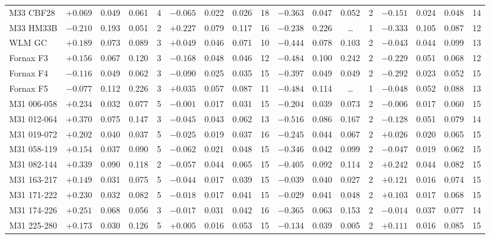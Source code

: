 \documentclass{aa}
\begin{document}
\begin{appendix}
\begin{table*}
\begin{adjustbox}{width=1\textwidth}
{\begin{tabular}{l cccccccccccccccc}
M33 CBF28     & $+0.069$ & 0.049 & 0.061 & 4 & $-0.065$ & 0.022 & 0.026 & 18 & $-0.363$ & 0.047 & 0.052 & 2 & $-0.151$ & 0.024 & 0.048 & 14 \\
M33 HM33B     & $-0.210$ & 0.193 & 0.051 & 2 & $+0.227$ & 0.079 & 0.117 & 16 & $-0.238$ & 0.226 & \ldots & 1 & $-0.333$ & 0.105 & 0.087 & 12 \\
WLM GC        & $+0.189$ & 0.073 & 0.089 & 3 & $+0.049$ & 0.046 & 0.071 & 10 & $-0.444$ & 0.078 & 0.103 & 2 & $-0.043$ & 0.044 & 0.099 & 13 \\
Fornax F3     & $+0.156$ & 0.067 & 0.120 & 3 & $-0.168$ & 0.048 & 0.046 & 12 & $-0.484$ & 0.100 & 0.242 & 2 & $-0.229$ & 0.051 & 0.068 & 12 \\
Fornax F4     & $-0.116$ & 0.049 & 0.062 & 3 & $-0.090$ & 0.025 & 0.035 & 15 & $-0.397$ & 0.049 & 0.049 & 2 & $-0.292$ & 0.023 & 0.052 & 15 \\
Fornax F5     & $-0.077$ & 0.112 & 0.226 & 3 & $+0.035$ & 0.057 & 0.087 & 11 & $-0.484$ & 0.114 & \ldots & 1 & $-0.048$ & 0.052 & 0.088 & 13 \\
M31 006-058   & $+0.234$ & 0.032 & 0.077 & 5 & $-0.001$ & 0.017 & 0.031 & 15 & $-0.204$ & 0.039 & 0.073 & 2 & $-0.006$ & 0.017 & 0.060 & 15 \\
M31 012-064   & $+0.370$ & 0.075 & 0.147 & 3 & $-0.045$ & 0.043 & 0.062 & 13 & $-0.516$ & 0.086 & 0.167 & 2 & $-0.128$ & 0.051 & 0.079 & 14 \\
M31 019-072   & $+0.202$ & 0.040 & 0.037 & 5 & $-0.025$ & 0.019 & 0.037 & 16 & $-0.245$ & 0.044 & 0.067 & 2 & $+0.026$ & 0.020 & 0.065 & 15 \\
M31 058-119   & $+0.154$ & 0.037 & 0.090 & 5 & $-0.062$ & 0.021 & 0.048 & 15 & $-0.346$ & 0.042 & 0.099 & 2 & $-0.047$ & 0.019 & 0.062 & 15 \\
M31 082-144   & $+0.339$ & 0.090 & 0.118 & 2 & $-0.057$ & 0.044 & 0.065 & 15 & $-0.405$ & 0.092 & 0.114 & 2 & $+0.242$ & 0.044 & 0.082 & 15 \\
M31 163-217   & $+0.149$ & 0.031 & 0.075 & 5 & $-0.044$ & 0.017 & 0.039 & 15 & $-0.039$ & 0.040 & 0.027 & 2 & $+0.121$ & 0.016 & 0.074 & 15 \\
M31 171-222   & $+0.230$ & 0.032 & 0.082 & 5 & $-0.018$ & 0.017 & 0.041 & 15 & $-0.029$ & 0.041 & 0.048 & 2 & $+0.103$ & 0.017 & 0.068 & 15 \\
M31 174-226   & $+0.251$ & 0.068 & 0.056 & 3 & $-0.017$ & 0.031 & 0.042 & 16 & $-0.365$ & 0.063 & 0.153 & 2 & $-0.014$ & 0.037 & 0.077 & 14 \\
M31 225-280   & $+0.173$ & 0.030 & 0.126 & 5 & $+0.005$ & 0.016 & 0.053 & 15 & $-0.134$ & 0.039 & 0.005 & 2 & $+0.111$ & 0.016 & 0.085 & 15 \\

\end{tabular}}
\end{adjustbox}
\end{table*}
\end{appendix}
\end{document}
